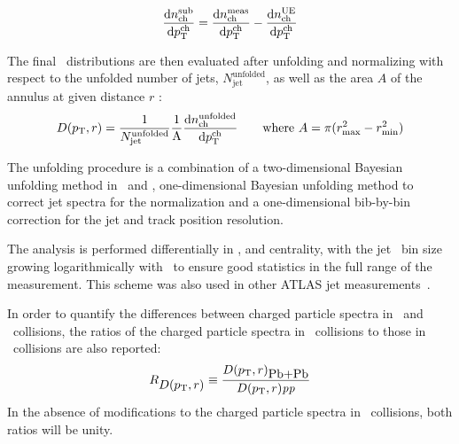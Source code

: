 \begin{equation}
\frac{\text{d}n^{\text{sub}}_{\text{ch}}}{\text{d}\mbox{$p_{{\mathrm{T}}}^{\mathrm{ch}}$}} = \frac{\text{d}n^{\text{meas}}_{\text{ch}}}{\text{d}\mbox{$p_{{\mathrm{T}}}^{\mathrm{ch}}$}} - \frac{\text{d}n^{\text{UE}}_{\text{ch}}}{\text{d}\mbox{$p_{{\mathrm{T}}}^{\mathrm{ch}}$}}
\end{equation}

The final \Dptr\ distributions are then evaluated after unfolding and normalizing with respect to the unfolded number of jets, $N_{\text{jet}}^{\text{unfolded}}$, as well as the area $A$ of the annulus at given distance $r$ :
\begin{equation}
\Dptr = \frac{1}{N_{\text{jet}}^{\text{unfolded}}} \frac{1}{\text{A}} \frac{\text{d}n^{\text{unfolded}}_{\text{ch}}}{\text{d}\pTch} \quad \quad \text{where } A = \pi (r_{\text{max}}^2 - r_{\text{min}}^2)
\end{equation}

The unfolding procedure is a combination of a two-dimensional Bayesian unfolding method in \ptjet\ and \pttrk, one-dimensional Bayesian unfolding method to correct jet spectra for the normalization and a one-dimensional bib-by-bin correction for the jet and track position resolution. 

The analysis is performed differentially in \ptjet, and centrality, with the jet \pt\ bin size growing logarithmically with \ptjet\ to ensure good statistics in the full range of the measurement. This scheme was also used in other ATLAS jet measurements~\cite{ATLAS276FFConf}. 

In order to quantify the differences between charged particle spectra in \pbpb\ and \pp\  collisions, the ratios of the charged particle spectra in \pbpb\ collisions to those in \pp\ collisions are also reported:
\begin{equation}
   R_{\mbox{$D( p_{\mathrm{T}}, r)$}} \equiv \frac{\mbox{$D( p_{\mathrm{T}}, r)$}_{\mbox{Pb+Pb}}}{\mbox{$D( p_{\mathrm{T}}, r)$}{\mbox{\textit{pp}}}}
\end{equation}
In the absence of modifications to the charged particle spectra in \pbpb\ collisions, both ratios will be unity.


